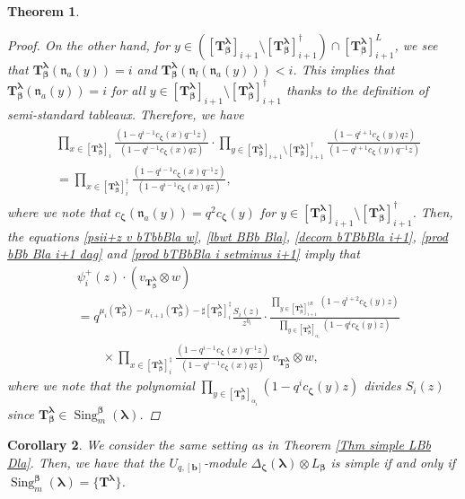 \documentclass[12pt]{amsart}
\newtheorem{thm}{Theorem}[section]
\newtheorem{cor}[thm]{Corollary}
\numberwithin{equation}{thm}
\newcommand\bT{\mathbf T}
\newcommand\bb{\mathbf b}
\newcommand\fn{\mathfrak n}
\renewcommand\a{\alpha}  %
\newcommand\D{\Delta}
\newcommand\Bb{\boldsymbol\beta}
\newcommand\Bz{\boldsymbol\zeta}
\newcommand\Bla{\boldsymbol\lambda}
\newcommand{\Sing}{\operatorname{Sing}}
\newcounter{ni}
\begin{document}
\begin{thm}
\begin{proof}
On the other hand, 
for $y \in ([\bT_{\Bb}^{\Bla}]_{i+1} \setminus [\bT_{\Bb}^{\Bla}]_{i+1}^{\dag}) \cap [\bT_{\Bb}^{\Bla}]_{i+1}^L $, 
we see that 
$\bT_{\Bb}^{\Bla}(\fn_a(y))=i$ and $ \bT_{\Bb}^{\Bla} (\fn_l(\fn_a(y))) < i$.  
This implies that $\bT_{\Bb}^{\Bla}(\fn_a(y)) = i$ for all $y \in [\bT_{\Bb}^{\Bla}]_{i+1} \setminus [\bT_{\Bb}^{\Bla}]_{i+1}^{\dag}$ 
thanks to the definition of semi-standard tableaux. 
Therefore,  we have 
\begin{align}
\label{prod bTBbBla i setminus i+1} 
\begin{split}
&\prod_{x \in [\bT_{\Bb}^{\Bla}]_i}  \frac{(1 - q^{i-1} c_{\Bz} (x) q^{-1} z)}{ (1 - q^{i-1} c_{\Bz}(x) q z)} 
	\cdot \prod_{y \in [\bT_{\Bb}^{\Bla}]_{i+1} \setminus [\bT_{\Bb}^{\Bla}]_{i+1}^{\dag} } 
		\frac{ (1 - q^{i+1} c_{\Bz} (y) q z )}{ (1 - q^{i+1} c_{\Bz} (y) q^{-1} z )}
\\
&= \prod_{x \in [\bT_{\Bb}^{\Bla}]_i^{\ddag} }  \frac{(1 - q^{i-1} c_{\Bz} (x) q^{-1} z)}{ (1 - q^{i-1} c_{\Bz}(x) q z)}, 
\end{split}
\end{align}
where we note that $c_{\Bz} (\fn_a (y)) = q^2 c_{\Bz} (y)$ 
for $y \in [\bT_{\Bb}^{\Bla}]_{i+1} \setminus [\bT_{\Bb}^{\Bla}]_{i+1}^{\dag}$. 
Then, the equations 
\eqref{psii+z v bTbbBla w}, 
\eqref{lbwt BBb Bla}, \eqref{decom bTBbBla i+1}, \eqref{prod bBb Bla i+1 dag} and \eqref{prod bTBbBla i setminus i+1}
imply that 
\begin{align*}
&\psi_{i}^+(z) \cdot (v_{\bT_{\Bb}^{\Bla}} \otimes w) 
\\
&= q^{\mu_i (\bT_{\Bb}^{\Bla}) - \mu_{i+1} (\bT_{\Bb}^{\Bla}) - \sharp [\bT_{\Bb}^{\Bla}]_i^{\ddag}} 
	\frac{ S_i(z)}{z^{b_i}} 
	\cdot \frac{ \prod_{y \in [\bT_{\Bb}^{\Bla}]_{i+1}^{\dag R}} (1 - q^{i+2} c_{\Bz}(y) z)}
		{\prod_{ y \in  [\bT_{\Bb}^{\Bla}]_{\a_i}} (1 - q^i c_{\Bz} (y) z)} 
	\\ & \qquad 
	\times 
	\prod_{x \in [\bT_{\Bb}^{\Bla}]_i^{\ddag} }  \frac{(1 - q^{i-1} c_{\Bz} (x) q^{-1} z)}{ (1 - q^{i-1} c_{\Bz}(x) q z)} 
	\, 
	v_{\bT_{\Bb}^{\Bla}} \otimes w, 
\end{align*}
where we note that 
the polynomial 
$\prod_{y \in  [\bT_{\Bb}^{\Bla}]_{\a_i}} (1 - q^i c_{\Bz} (y) z)$ 
divides $S_i(z)$ since $\bT_{\Bb}^{\Bla} \in \Sing_m^{\Bb} (\Bla) $. 
\end{proof}
\end{thm}

\begin{cor}
\label{Cor simple D otimes LBb}
We consider the same setting as in Theorem \ref{Thm simple LBb Dla}. 
Then, we have that 
the $U_{q,[\bb]}$-module $ \D_{\Bz} (\Bla) \otimes L_{\Bb}$ is simple if and only if 
$\Sing_m^{\Bb} (\Bla) = \{ \bT^{\Bla}\}$. 
\end{cor} 
\end{document}
